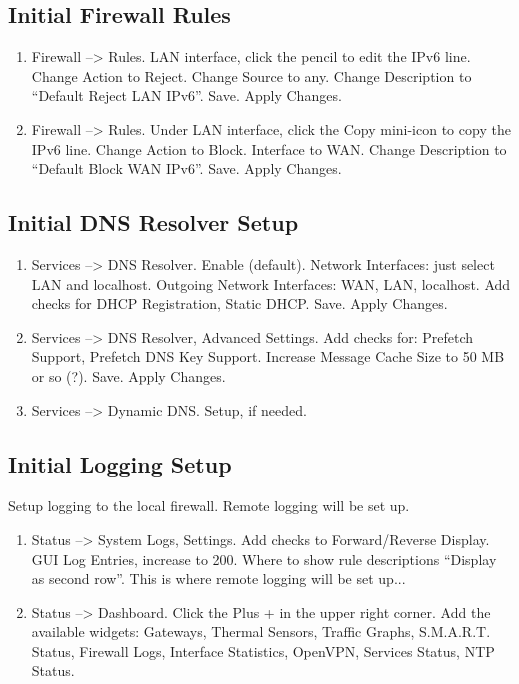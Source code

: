 \subsection{Initial Firewall Rules}
\begin{enumerate}
 \item Firewall --> Rules. LAN interface, click the pencil to edit the IPv6 line. Change Action to Reject. Change Source to any. Change Description to ``Default Reject LAN IPv6''. Save. Apply Changes.
 \item Firewall --> Rules. Under LAN interface, click the Copy mini-icon to copy the IPv6 line. Change Action to Block. Interface to WAN. Change Description to ``Default Block WAN IPv6''. Save. Apply Changes.
\end{enumerate}

\subsection{Initial DNS Resolver Setup}
\begin{enumerate}
 \item Services --> DNS Resolver. Enable (default). Network Interfaces: just select LAN and localhost. Outgoing Network Interfaces: WAN, LAN, localhost. Add checks for DHCP Registration, Static DHCP. Save. Apply Changes.
 \item Services --> DNS Resolver, Advanced Settings. Add checks for: Prefetch Support, Prefetch DNS Key Support. Increase Message Cache Size to 50 MB or so (?). Save. Apply Changes.
 \item Services --> Dynamic DNS. Setup, if needed.
\end{enumerate}

\subsection{Initial Logging Setup}
Setup logging to the local firewall. Remote logging will be set up.

\begin{enumerate}
 \item Status --> System Logs, Settings. Add checks to Forward/Reverse Display. GUI Log Entries, increase to 200. Where to show rule descriptions ``Display as second row''. This is where remote logging will be set up... 
 \item Status --> Dashboard. Click the Plus + in the upper right corner. Add the available widgets: Gateways, Thermal Sensors, Traffic Graphs, S.M.A.R.T. Status, Firewall Logs, Interface Statistics, OpenVPN, Services Status, NTP Status.
\end{enumerate}

